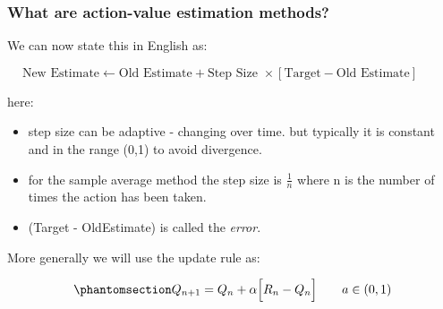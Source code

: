 \documentclass[
  letterpaper,
  DIV=11,
  numbers=noendperiod,
  oneside]{scrartcl}
\providecommand{\tightlist}{%
  \setlength{\itemsep}{0pt}\setlength{\parskip}{0pt}}\usepackage{longtable,booktabs,array}
\theoremstyle{definition}
\theoremstyle{remark}
\begin{document}
\subsubsection{What are action-value estimation methods?}\label{L2G6}

We can now state this in English as:

\[
\text{New Estimate} \leftarrow \text{Old Estimate} + \text{Step Size } \times [\text{Target} - \text{Old Estimate}] \qquad
\]

here:

\begin{itemize}
\tightlist
\item
  step size can be adaptive - changing over time. but typically it is
  constant and in the range (0,1) to avoid divergence.
\item
  for the sample average method the step size is \(\frac{1}{n}\) where n
  is the number of times the action has been taken.
\item
  (Target - OldEstimate) is called the \emph{error}.
\end{itemize}

More generally we will use the update rule as:

\begin{equation}\phantomsection\label{eq-general-incremental-update-rule}{
Q_{n+1} = Q_n + \alpha \Big[R_n - Q_{n}\Big] \qquad a\in (0,1)
}\end{equation}
\end{document}
